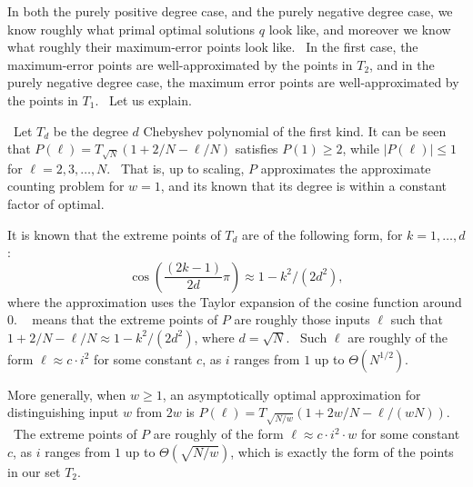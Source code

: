 In both the purely positive degree case, and the purely negative degree
case, we know roughly what primal optimal solutions $q$ look like, and
moreover we know what roughly their maximum-error points look like. \ In the
first case, the maximum-error points are well-approximated by the points in $
T_{2}$, and in the purely negative degree case, the maximum error points are
well-approximated by the points in $T_{1}$. \ Let us explain.

 \ Let $T_{d}$ be
the degree $d$ Chebyshev polynomial of the first kind.  It can be seen that $
P(\ell )=T_{\sqrt{N}}\left( 1+2/N-\ell /N\right) $ satisfies $P(1)\geq 2$,
while $|P(\ell )|\leq 1$ for $\ell =2,3,\dots ,N$. \ That is, up to scaling,
$P$ approximates the approximate counting problem for $w=1$, and its known
that its degree is within a constant factor of optimal.

It is known that the extreme points of $T_{d}$ are of the following form,
for $k=1,\dots ,d$:
\begin{equation}
\cos \left( \frac{(2k-1)}{2d}\pi \right) \approx 1-k^{2}/(2d^{2}),
\label{tester}
\end{equation}
where the approximation uses the Taylor expansion of the cosine function
around $0$. \  means that the extreme points of $P$
are roughly those inputs $\ell $ such that $1+2/N-\ell /N\approx
1-k^{2}/(2d^{2})$, where $d=\sqrt{N}$. \ Such $\ell $ are roughly of the
form $\ell \approx c\cdot i^{2}$ for some constant $c$, as $i$ ranges from $1
$ up to $\Theta (N^{1/2})$.

More generally, when $w\geq 1$, an asymptotically optimal approximation for
distinguishing input $w$ from $2w$ is $P(\ell )=T_{\sqrt{N/w}}\left(
1+2w/N-\ell /(wN)\right) $. \ The extreme points of $P$ are roughly of the
form $\ell \approx c\cdot i^{2}\cdot w$ for some constant $c$, as $i$ ranges
from $1$ up to $\Theta (\sqrt{N/w})$, which is exactly the form of the
points in our set $T_{2}$.

